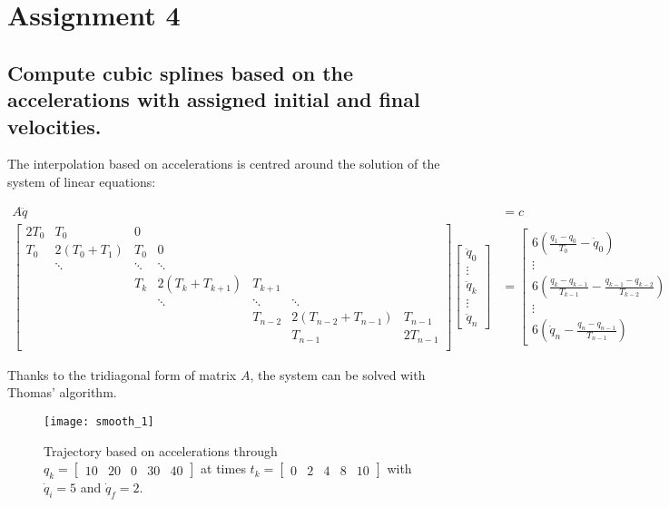 \section{Assignment 4}

\subsection{Compute cubic splines based on the accelerations with assigned initial and final velocities.}

The interpolation based on accelerations is centred around the solution of the system of linear equations:

\begin{align*}
A\ddot q &= c\\
\begin{bmatrix}
2T_0 & T_0 & 0\\
T_0 & 2(T_0+T_1) & T_0 & 0\\
& \ddots & \ddots & \ddots \\
& & T_k & 2(T_k+T_{k+1}) & T_{k+1}\\
& & & \ddots & \ddots & \ddots\\
& & & & T_{n-2} & 2(T_{n-2}+T_{n-1})& T_{n-1}\\
& & & & & T_{n-1} & 2T_{n-1}\\
\end{bmatrix}\begin{bmatrix}
\ddot q_0\\\vdots\\\ddot q_k\\\vdots\\\ddot q_n
\end{bmatrix}&=\begin{bmatrix}
6\left(\frac{q_1-q_0}{T_0}-\dot q_0\right)\\
\vdots\\
6\left(\frac{q_k-q_{k-1}}{T_{k-1}}-\frac{q_{k-1}-q_{k-2}}{T_{k-2}}\right)\\
\vdots\\
6\left(\dot q_n-\frac{q_{n}-q_{n-1}}{T_{n-1}}\right)
\end{bmatrix}
\end{align*}

Thanks to the tridiagonal form of matrix $A$, the system can be solved with Thomas' algorithm.

\begin{figure}[h]
\centering
\texttt{[image: smooth\_1]}
\caption{Trajectory based on accelerations through $q_k=\begin{bmatrix}
10 & 20 & 0 & 30 & 40
\end{bmatrix}$ at times $t_k=\begin{bmatrix}
0 & 2 & 4 & 8 & 10
\end{bmatrix}$ with $\dot q_i=5$ and $\dot q_f=2$.}
\end{figure}

